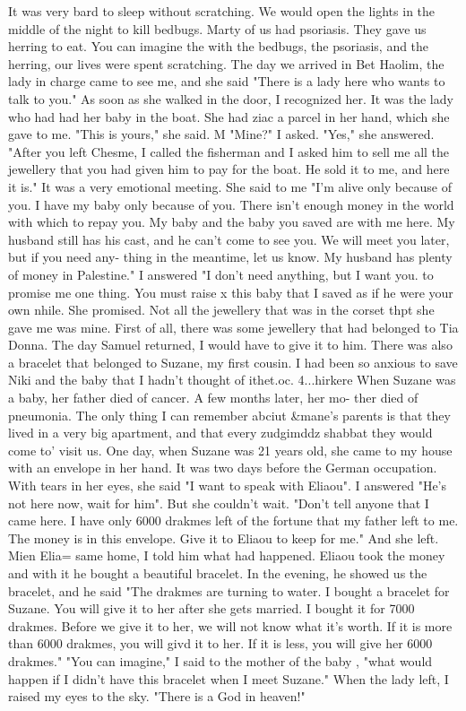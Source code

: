 It was very 
bard to sleep without scratching.
We would open the lights in the middle of the night to 
kill bedbugs.
Marty of us had psoriasis.
They gave us herring to eat.
You can imagine the 
with the bedbugs, the psoriasis, and the herring, our lives were spent scratching.
The day we arrived in Bet Haolim, the lady in charge came to see me, and she said 
"There is a lady here who wants to talk to you."
As soon as she walked in the door, I 
recognized her.
It was the lady who had had her baby in the boat.
She had ziac a parcel 
in her hand, which she gave to me.
"This is yours," she said.
M "Mine?"
I asked.
"Yes," 
she answered.
"After you left Chesme, I called the fisherman and I asked him to sell me 
all the jewellery that you had given him to pay for the boat.
He sold it to me, and 
here it is."
It was a very emotional meeting.
She said to me "I'm alive only because 
of you.
I have my baby only because of you.
There isn't enough money in the world with 
which to repay you.
My baby and the baby you saved are with me here.
My husband still 
has his cast, and he can't come to see you.
We will meet you later, but if you need any-
thing in the meantime, let us know.
My husband has plenty of money in Palestine."
I 
answered "I don't need anything, but I want you.
to promise me one thing.
You must raise 
x this baby that I saved as if he were your own nhile.
She promised.
Not all the jewellery that was in the corset thpt she gave me was mine.
First of all, 
there was some jewellery that had belonged to Tia Donna.
The day Samuel returned, I 
would have to give it to him.
There was also a bracelet that belonged to Suzane, my first 
cousin.
I had been so anxious to save Niki and the baby that I hadn't thought of 
ithet.oc.
4...hirkere 
When Suzane was a baby, her father died of cancer.
A few months later, her mo-
ther died of pneumonia.
The only thing I can remember abciut &mane's parents is that 
they lived in a very big apartment, and that every zudgimddz shabbat they would come to' 
visit us.
One day, when Suzane was 21 years old, she came to my house with an envelope 
in her hand.
It was two days before the German occupation.
With tears in her eyes, she 
said "I want to speak with Eliaou".
I answered "He's not here now, wait for him".
But she couldn't wait.
"Don't tell anyone that I came here.
I have only 6000 drakmes 
left of the fortune that my father left to me.
The money is in this envelope.
Give it 
to Eliaou to keep for me."
And she left.
Mien Elia= same home, I told him what had happened.
Eliaou took the money and 
with it he bought a beautiful bracelet.
In the evening, he showed us the bracelet, and 
he said "The drakmes are turning to water.
I bought a bracelet for Suzane.
You will 
give it to her after she gets married.
I bought it for 7000 drakmes.
Before we give 
it to her, we will not know what it's worth.
If it is more than 6000 drakmes, you will 
givd it to her.
If it is less, you will give her 6000 drakmes."
"You can imagine," I said to the mother of the baby , "what would happen if I 
didn't have this bracelet when I meet Suzane."
When the lady left, I raised my eyes 
to the sky.
"There is a God in heaven!"